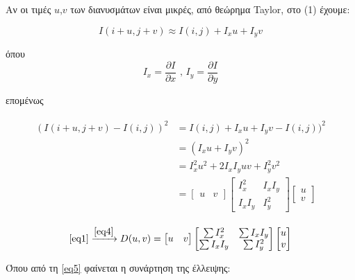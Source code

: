  
\newpage

 Αν οι τιμές $u$,$v$ των διανυσμάτων είναι μικρές, από θεώρημα Taylor, στο (1) έχουμε: 
 
\begin{equation}
    I(i+u,j+v) \approx I(i,j) + I_{x}u+I_{y}v  
\end{equation}
    
    όπου
\begin{equation}
 I_{x} = \frac{\partial I}{\partial x} \text{ , } I_{y} = \frac{\partial I}{\partial y}  
\end{equation}

 επομένως 
 

\begin{align}
\begin{split}
\label{eq4}
 (I(i+u,j+v)-I(i,j))^2 &= I(i,j)+I_xu+I_yv-I(i,j))^2 \\
 &= (I_xu+I_yv)^2  \\
 &= I_x^2u^2 + 2I_xI_yuv+I_y^2v^2 \\
 &=  \begin{bmatrix}  u & v \end{bmatrix}
 \begin{bmatrix} I_x^2 & I_xI_y \\ I_xI_y & I_y^2 \end{bmatrix}
 \begin{bmatrix} u\\ v \end{bmatrix}  
\end{split}
\end{align}

\begin{equation}
\label{eq5}
 \ref{eq1}\xrightarrow{\ref{eq4}}  D(u,v) = \begin{bmatrix} u & v \end{bmatrix}   \begin{bmatrix} \sum I_x^2 & \sum I_xI_y \\ \sum I_xI_y & \sum I_y^2 \end{bmatrix}\begin{bmatrix} u\\ v \end{bmatrix} 
\end{equation}


 \vspace{0.5cm}

Όπου από τη \ref{eq5} φαίνεται η συνάρτηση της έλλειψης:
\vspace{0.1cm}

